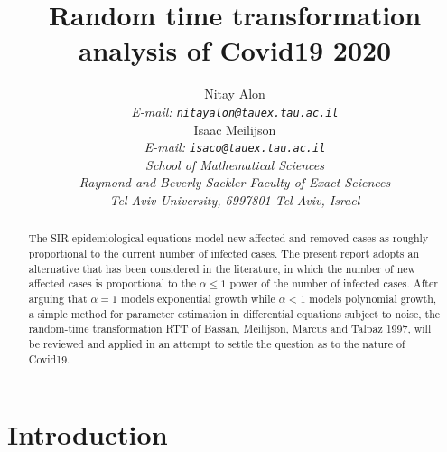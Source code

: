 \documentclass{article}
\begin{document}
\title {Random time transformation analysis of Covid19 2020
}

\author {
Nitay Alon
\\
{\em E-mail: \tt{nitayalon@tauex.tau.ac.il}} \\
Isaac Meilijson
\\
{\em E-mail: \tt{isaco@tauex.tau.ac.il}} \\
{\em School of Mathematical Sciences} \\
{\em Raymond and Beverly Sackler Faculty of Exact Sciences} \\
{\em Tel-Aviv University, 6997801 Tel-Aviv, Israel} \\
}


\maketitle


\begin{abstract}
\noindent The SIR epidemiological equations model new affected and removed cases as roughly proportional to the current number of infected cases. The present report adopts an alternative that has been considered in the literature, in which the number of new affected cases is proportional to the $\alpha \le 1$ power of the number of infected cases. After arguing that $\alpha=1$ models exponential growth while $\alpha<1$ models polynomial growth, a simple method for parameter estimation in differential equations subject to noise, the random-time transformation RTT of Bassan, Meilijson, Marcus and Talpaz 1997, will be reviewed and applied in an attempt to settle the question as to the nature of Covid19.

%
\end{abstract}





\section{Introduction} \label{introduction}
\end{document}
